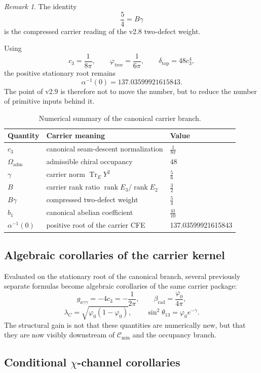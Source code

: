 \documentclass[11pt,a4paper]{article}
\theoremstyle{definition}
\theoremstyle{remark}
\newtheorem*{remark}{Remark}
\newcommand{\cthree}{c_3}
\newcommand{\phitree}{\varphi_{\mathrm{tree}}}
\newcommand{\phiz}{\varphi_0}
\newcommand{\deltatop}{\delta_{\mathrm{top}}}
\newcommand{\bone}{b_1}
\newcommand{\tr}{\operatorname{Tr}}
\newcommand{\rank}{\operatorname{rank}}
\newcommand{\Oadm}{\Omega_{\mathrm{adm}}}
\newcommand{\Cmin}{\mathcal C_{\min}}
\begin{document}
\begin{remark}
The identity
\[
\frac54 = B\gamma
\]
is the compressed carrier reading of the v2.8 two-defect weight.
\end{remark}

Using
\[
\cthree=\frac{1}{8\pi},
\qquad
\phitree=\frac{1}{6\pi},
\qquad
\deltatop=48\cthree^4,
\]
the positive stationary root remains
\[
\alpha^{-1}(0)=\num{137.03599921615843}.
\]
The point of v2.9 is therefore not to move the number, but to reduce the number of primitive inputs behind it.

\begin{table}[H]
\centering
\small
\begin{tabularx}{\linewidth}{@{}lXl@{}}
\toprule
Quantity & Carrier meaning & Value \\
\midrule
$\cthree$ & canonical seam-descent normalization & $\frac{1}{8\pi}$ \\
$\Oadm$ & admissible chiral occupancy & $48$ \\
$\gamma$ & carrier norm $\tr_EY^2$ & $\frac56$ \\
$B$ & carrier rank ratio $\rank E_3/\rank E_2$ & $\frac32$ \\
$B\gamma$ & compressed two-defect weight & $\frac54$ \\
$\bone$ & canonical abelian coefficient & $\frac{41}{10}$ \\
$\alpha^{-1}(0)$ & positive root of the carrier CFE & \num{137.03599921615843} \\
\bottomrule
\end{tabularx}
\caption{Numerical summary of the canonical carrier branch.}
\end{table}

\subsection{Algebraic corollaries of the carrier kernel}

Evaluated on the stationary root of the canonical branch, several previously separate formulas become algebraic corollaries of the same carrier package:
\[
g_{a\gamma\gamma}=-4\cthree=-\frac{1}{2\pi},
\qquad
\beta_{\mathrm{rad}}=\frac{\phiz}{4\pi},
\]
\[
\lambda_C=\sqrt{\phiz(1-\phiz)},
\qquad
\sin^2\theta_{13}=\phiz e^{-\gamma}.
\]
The structural gain is not that these quantities are numerically new, but that they are now visibly downstream of $\Cmin$ and the occupancy branch.

\subsection{Conditional \texorpdfstring{$\chi$}{chi}-channel corollaries}
\end{document}
